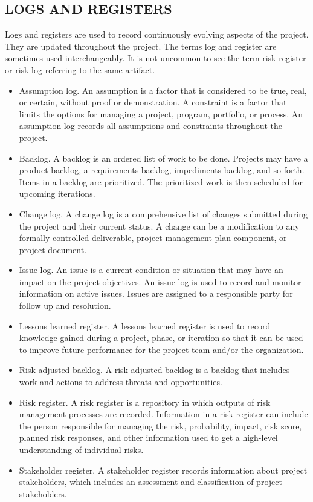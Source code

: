 \documentclass[11pt]{article}
\begin{document}
\subsection{LOGS AND REGISTERS}
\label{sec:org9e53622}
Logs and registers are used to record continuously evolving aspects of the project. They are updated throughout the project. The terms log and register are sometimes used interchangeably. It is not uncommon to see the term risk register or risk log referring to the same artifact.
\begin{itemize}
\item Assumption log. An assumption is a factor that is considered to be true, real, or certain, without proof or demonstration. A constraint is a factor that limits the options for managing a project, program, portfolio, or process. An assumption log records all assumptions and constraints throughout the project.
\item Backlog. A backlog is an ordered list of work to be done. Projects may have a product backlog, a requirements backlog, impediments backlog, and so forth. Items in a backlog are prioritized. The prioritized work is then scheduled for upcoming iterations.
\item Change log. A change log is a comprehensive list of changes submitted during the project and their current status. A change can be a modification to any formally controlled deliverable, project management plan component, or project document.
\item Issue log. An issue is a current condition or situation that may have an impact on the project objectives. An issue log is used to record and monitor information on active issues. Issues are assigned to a responsible party for follow up and resolution.
\item Lessons learned register. A lessons learned register is used to record knowledge gained during a project, phase, or iteration so that it can be used to improve future performance for the project team and/or the organization.
\item Risk-adjusted backlog. A risk-adjusted backlog is a backlog that includes work and actions to address threats and opportunities.
\item Risk register. A risk register is a repository in which outputs of risk management processes are recorded. Information in a risk register can include the person responsible for managing the risk, probability, impact, risk score, planned risk responses, and other information used to get a high-level understanding of individual risks.
\item Stakeholder register. A stakeholder register records information about project stakeholders, which includes an assessment and classification of project stakeholders.
\end{itemize}
\end{document}

